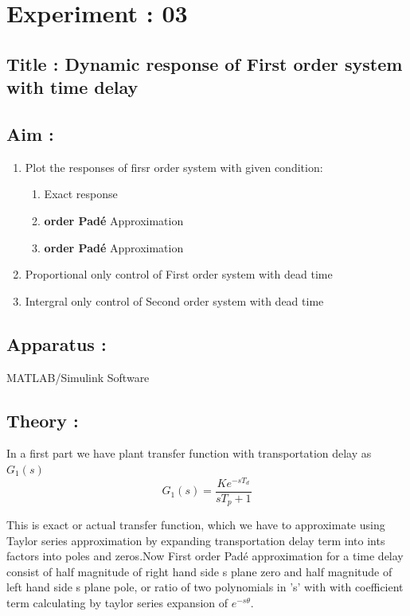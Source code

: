 \message{ !name(lab1.tex)}\documentclass[a4paper,12pt,openany]{book}
\begin{document}
\chapter{Experiment : 03}
\section{Title : Dynamic response of First order system with time delay}
\section{Aim :}
\begin{enumerate}
\item Plot the responses of firsr order system with given condition:
  \begin{enumerate}
  \item Exact response
  \item {\bf {} order Pad\'e} Approximation
  \item {\bf {} order Pad\'e} Approximation
  \end{enumerate}
\item Proportional only control of First order system with dead time
\item Intergral only control of Second order system with dead time
\end {enumerate}

\section{Apparatus :}
MATLAB/Simulink Software \par
\section{Theory :}
In a first part we have plant transfer function with transportation delay as $G_1(s)$
\begin{equation}
  G_1(s) = \frac{Ke^{-sT_d}}{sT_p + 1}
\end{equation}
\par
This is exact or actual transfer function, which we have to approximate using
Taylor series approximation by expanding transportation delay term into ints
factors into poles and zeros.Now First order Pad\'e approximation for a time delay
consist of half magnitude of right hand side s plane zero and half magnitude of
left hand side s plane pole, or ratio of two polynomials in 's' with with
coefficient term calculating by taylor series expansion of $e^{-s\theta}$.
\end{document}
